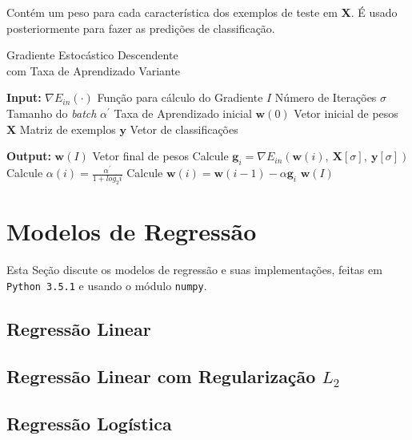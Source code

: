 \documentclass[a4paper, 12pt]{article}
\begin{document}
Contém um peso para cada característica dos exemplos de teste
em \textbf{X}. É usado posteriormente para fazer as predições
de classificação.

\begin{algorithm}[htpb]
    \caption{Gradiente Estocástico Descendente \\ com Taxa de Aprendizado Variante}
    \label{alg:GSD}
    \begin{algorithmic}[1]
        \Statex \item[\textbf{Input:}]
        \Statex $\nabla{}E_{in}(\cdot)$ \Comment Função para cálculo do Gradiente
        \Statex $I$ \Comment Número de Iterações
        \Statex $\sigma$ \Comment Tamanho do \textit{batch}
        \Statex $\alpha^{\prime}$ \Comment Taxa de Aprendizado inicial
        \Statex $\textbf{w}(0)$ \Comment Vetor inicial de pesos
        \Statex $\textbf{X}$ \Comment Matriz de exemplos
        \Statex $\textbf{y}$ \Comment Vetor de classificações
        \Statex \item[\textbf{Output:}]
        \Statex $\textbf{w}(I)$ \Comment Vetor final de pesos
        \Statex
        \State Calcule $\textbf{g}_i = \nabla{}E_{in}(\textbf{w}(i),\: \textbf{X}[\sigma],\: \textbf{y}[\sigma])$
        \State Calcule $\alpha(i) = \frac{\alpha^{\prime}}{1 + log_{2}i}$
        \State Calcule $\textbf{w}(i) = \textbf{w}(i -1) - \alpha{}\textbf{g}_i$
        \EndFor
        \State \Return $\textbf{w}(I)$
    \end{algorithmic}
\end{algorithm}


\section{Modelos de Regressão} \label{sec:regr}

Esta Seção discute os modelos de regressão
e suas implementações, feitas em \texttt{Python 3.5.1} e usando o
módulo \texttt{numpy}.

\subsection{Regressão Linear}

\subsection{Regressão Linear com Regularização $L_2$}

\subsection{Regressão Logística}
\end{document}
